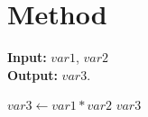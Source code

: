 \setlength{\parindent}{0pt}
\chapter{\bf Method}
\label{chap:method}
\lipsum[9]
\begin{algorithm}
	\caption{$\textsc{Multiplier}$}{%
	\label{alg:expand}
	\textbf{Input:}  \(var1\), \(var2\)\\
	\textbf{Output:} \(var3\).
    \begin{algorithmic}[1]
        \State \(var3 \gets var1*var2\)
        \State \Return \(var3\)
	\end{algorithmic}}
\end{algorithm}
